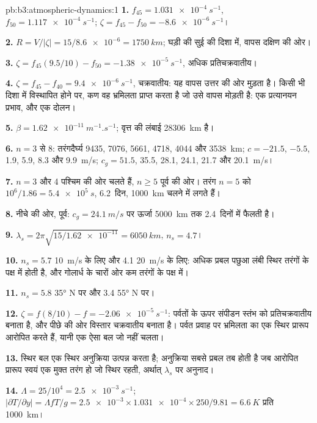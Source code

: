 \begin{solution}{pb:b3:atmospheric-dynamics:1}
\textbf{1.} $f_{45} = \qty{1.031e-4}{s^{-1}}$, $f_{50} =
\qty{1.117e-4}{s^{-1}}$; $\zeta = f_{45} - f_{50} = \qty{-8.6e-6}{s^{-1}}$।

\textbf{2.} $R = V/|\zeta| = 15/\num{8.6e-6} = \qty{1750}{km}$; घड़ी की सुई की दिशा में,
वापस दक्षिण की ओर।

\textbf{3.} $\zeta = f_{45}(9.5/10) - f_{50} = \qty{-1.38e-5}{s^{-1}}$, अधिक
प्रतिचक्रवातीय।

\textbf{4.} $\zeta = f_{45} - f_{40} = \qty{+9.4e-6}{s^{-1}}$, चक्रवातीय: यह
वापस उत्तर की ओर मुड़ता है। किसी भी दिशा में विस्थापित होने पर, कण वह भ्रमिलता प्राप्त करता है
जो उसे वापस मोड़ती है: एक प्रत्यानयन प्रभाव, और एक दोलन।

\textbf{5.} $\beta = \qty{1.62e-11}{m^{-1}.s^{-1}}$; वृत्त की लंबाई
\qty{28306}{km} है।

\textbf{6.} $n = 3$ से 8: तरंगदैर्घ्य 9435, 7076, 5661, 4718, 4044 और
\qty{3538}{km}; $c = -21.5$, $-5.5$, 1.9, 5.9, 8.3 और \qty{9.9}{m/s}; $c_g
= 51.5$, 35.5, 28.1, 24.1, 21.7 और \qty{20.1}{m/s}।

\textbf{7.} $n = 3$ और 4 पश्चिम की ओर चलते हैं, $n \ge 5$ पूर्व की ओर। तरंग $n = 5$ को
$10^6/1.86 = \qty{5.4e5}{s}$, \num{6.2}~दिन, \qty{1000}{km} चलने में लगते हैं।

\textbf{8.} नीचे की ओर, पूर्व: $c_g = \qty{24.1}{m/s}$ पर ऊर्जा
\qty{5000}{km} तक \num{2.4}~दिनों में फैलती है।

\textbf{9.} $\lambda_s = 2\pi\sqrt{15/\num{1.62e-11}} = \qty{6050}{km}$,
$n_s = 4.7$।

\textbf{10.} $n_s = 5.7$ \qty{10}{m/s} के लिए और 4.1 \qty{20}{m/s} के लिए: अधिक प्रबल पछुआ
लंबी स्थिर तरंगों के पक्ष में होती है, और
गोलार्ध के चारों ओर कम तरंगों के पक्ष में।

\textbf{11.} $n_s = 5.8$ \ang{35} N पर और 3.4 \ang{55} N पर।

\textbf{12.} $\zeta = f(8/10) - f = \qty{-2.06e-5}{s^{-1}}$: पर्वतों के ऊपर संपीडन
स्तंभ को प्रतिचक्रवातीय बनाता है, और पीछे की ओर विस्तार
चक्रवातीय बनाता है। पर्वत प्रवाह पर भ्रमिलता का एक स्थिर प्रारूप आरोपित करते हैं,
यानी एक ऐसा बल जो नहीं चलता।

\textbf{13.} स्थिर बल एक स्थिर अनुक्रिया उत्पन्न करता है; अनुक्रिया
सबसे प्रबल तब होती है जब आरोपित प्रारूप स्वयं एक मुक्त तरंग हो जो
स्थिर रहती, अर्थात् $\lambda_s$ पर अनुनाद।

\textbf{14.} $\Lambda = 25/10^4 = \qty{2.5e-3}{s^{-1}}$;
$|\partial T/\partial y| = \Lambda fT/g = \num{2.5e-3}\times\num{1.031e-4}
\times250/9.81 = \qty{6.6}{K}$ प्रति \qty{1000}{km}।


\end{solution}
